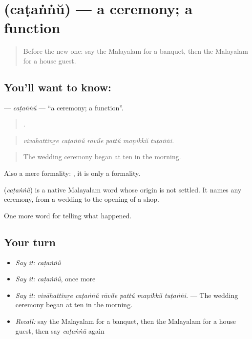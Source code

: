 \section[\texorpdfstring{\ml{ചടങ്ങ്} (caṭaṅṅŭ)}{ചടങ്ങ് (caṭaṅṅŭ)}]{ (caṭaṅṅŭ) — a ceremony; a function}

\label{lesson:ML-C387-catannu}



\begin{quote}
Before the new one: say the Malayalam for a banquet, then the Malayalam for a house guest.
\end{quote}

\subsection*{You'll want to know: }
\textbf{} — \emph{caṭaṅṅŭ} — \textquotedblleft{}a ceremony; a function\textquotedblright{}.

\begin{quote}
     .
\end{quote}

\begin{quote}
\emph{vivāhattinṟe caṭaṅṅŭ rāvile pattŭ maṇikkŭ tuṭaṅṅi.}
\end{quote}

\begin{quote}
The wedding ceremony began at ten in the morning.
\end{quote}

Also a mere formality:    , it is only a formality.

\begin{cousinweb}
\textbf{} (\emph{caṭaṅṅŭ}) is a native Malayalam word whose origin is not settled. It names any ceremony, from a wedding to the opening of a shop.
\end{cousinweb}

\begin{grammarlens}[title={What you've built}]
One more word for telling what happened.
\end{grammarlens}

\subsection*{Your turn}
\begin{itemize}
\raggedright
  \item \emph{Say it:} \emph{caṭaṅṅŭ}
  \item \emph{Say it:} \emph{caṭaṅṅŭ}, once more
  \item \emph{Say it:} \emph{vivāhattinṟe caṭaṅṅŭ rāvile pattŭ maṇikkŭ tuṭaṅṅi.} — The wedding ceremony began at ten in the morning.
  \item \emph{Recall:} say the Malayalam for a banquet, then the Malayalam for a house guest, then say \emph{caṭaṅṅŭ} again
\end{itemize}

